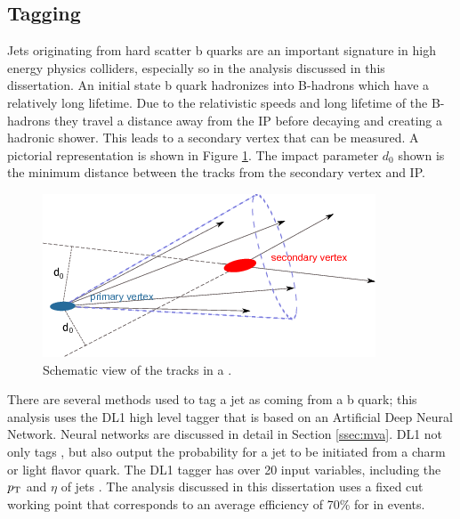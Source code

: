 		\subsection{\bjet Tagging}\label{ssec:flavor-tagging}
		Jets originating from hard scatter b quarks are an important signature in high energy physics colliders, especially so in the analysis discussed in this dissertation. An initial state b quark hadronizes into B-hadrons which have a relatively long lifetime. Due to the relativistic speeds and long lifetime of the B-hadrons they travel a distance away from the IP before decaying and creating a hadronic shower. This leads to a secondary vertex that can be measured. A pictorial representation is shown in Figure \ref{fig:bjet}. The impact parameter $d_0$ shown is the minimum distance between the tracks from the secondary vertex and IP. 

			\begin{figure}[!ht]
			\centering
			\includegraphics[width=.5\textwidth,keepaspectratio=true]{chapters/chapter5_eventreconnstruction/images/b-jet-schetch.png}
			\caption{\label{fig:bjet} Schematic view of the tracks in a \bjet \cite{bjet-trigger}.}
			\end{figure}

		There are several methods used to tag a jet as coming from a b quark; this analysis uses the DL1 high level tagger \cite{b-tagging} that is based on an Artificial Deep Neural Network. Neural networks are discussed in detail in Section \ref{ssec:mva}. DL1 not only tags \bjets, but also output the probability for a jet to be initiated from a charm or light flavor quark. The DL1 tagger has over 20 input variables, including the $p_{\text{T}}$ and $\eta$ of jets \cite{b-tagging-input-variables}. The analysis discussed in this dissertation uses a fixed cut working point that corresponds to an average efficiency of 70\% for \bjets in \ttbar events.


